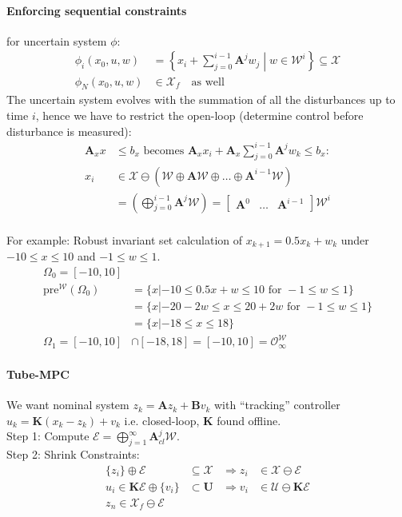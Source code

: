 \documentclass[landscape,a4paper,8pt]{scrartcl}
\renewcommand{\implies}{\Rightarrow}
\newcommand{\mc}[1]{\mathcal{#1}}
\newcommand\vA{\bm{A}}
\newcommand\vB{\bm{B}}
\newcommand\vK{\bm{K}}
\newcommand\vU{\bm{U}}
\newcommand{\Me}[1]{\begin{bmatrix}#1\end{bmatrix}} %
\begin{document}
\begin{multicols*}{3}
\paragraph{Enforcing sequential constraints} for uncertain system $\phi$:
\begin{align*}
\phi_i(x_0, u, w) & = \left\{ x_i + \sum_{j=0}^{i-1}\vA^j w_j \middle| w \in \mc W^i \right\} \subseteq \mc X \\
\phi_N(x_0, u, w) & \in \mc X_f \quad\text{as well}
\end{align*}
The uncertain system evolves with the summation of all the disturbances up to time $i$, hence we have to restrict the open-loop (determine control before disturbance is measured):
\begin{align*}
\vA_x x & \leq b_x \text{ becomes } \vA_x x_i + \vA_x \sum_{j=0}^{i-1}\vA^j w_k \leq b_x: \\
x_i & \in \mc X \ominus \left(\mc W \oplus \vA\mc W \oplus \dots \oplus \vA^{i-1}\mc W\right) \\
    & = \left(\bigoplus_{j=0}^{i-1}\vA^j\mc W\right) = \Me{\vA^0 & \dots & \vA^{i-1}}\mc W^i \\
\end{align*}

For example: Robust invariant set calculation of $x_{k+1} = 0.5x_k + w_k$ under $-10 \le x \le 10$ and $-1 \le w \le 1$.
\begin{align*}
\Omega_0 = [-10, 10] \\
	\text{pre}^\mc{W} (\Omega_0) &= \{x | -10 \le 0.5x + w \le 10 \text{ for } -1 \le w \le 1 \} \\
	&= \{x | -20 -2w \le x \le 20 + 2w \text{ for } -1 \le w \le 1 \} \\
	&= \{x | -18 \le x \le 18 \}\\
		\Omega_1 = [-10, 10] &\cap [-18, 18] = [-10, 10] = \mc O_\infty^{\mc W}
\end{align*}

\paragraph{Tube-MPC}
We want nominal system $z_k = \vA z_k + \vB v_k$ with ``tracking'' controller $u_k = \vK(x_k - z_k) + v_k$ i.e. closed-loop, $\vK$ found offline. \\
Step 1: Compute $\mc E = \bigoplus_{j=1}^\infty \vA_{cl}^j\mc W.$ \\
Step 2: Shrink Constraints:
\begin{align*}
\{z_i\} \oplus \mc E & \subseteq \mc X & \implies z_i & \in \mc X \ominus \mc E \\
u_i \in \vK\mc E \oplus \{v_i\} & \subset \vU & \implies v_i & \in \mc U \ominus \vK\mc E \\
z_n \in \mc X_f \ominus \mc E & & &
\end{align*}


\end{multicols*}
\end{document}
